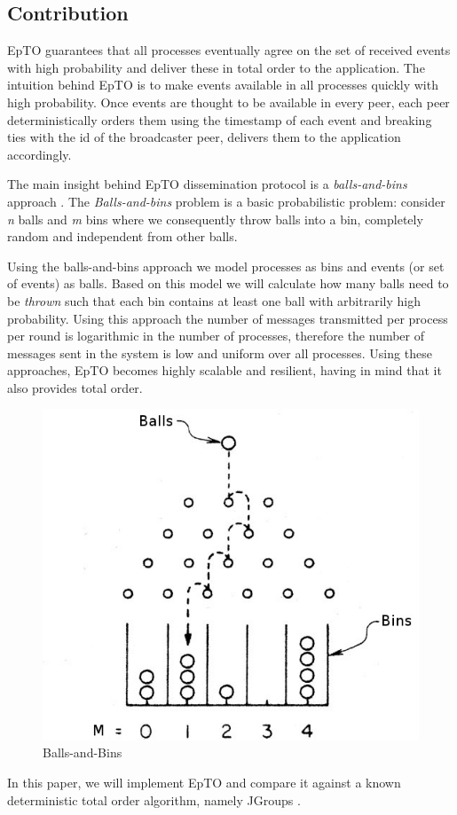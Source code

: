 \documentclass[10pt,conference,a4paper]{IEEEtran}
\begin{document}
\subsection{Contribution}
EpTO \autocite{matos2015epto} guarantees that all processes eventually agree on the set of received events with high probability and deliver these in total order to the application. The intuition behind EpTO is to make events available in all processes quickly with high probability.
Once events are thought to be available in every peer, each peer deterministically orders them using the timestamp of each event and breaking ties with the id of the broadcaster peer, delivers them to the application accordingly.
\par
The main insight behind EpTO dissemination protocol is a \textit{balls-and-bins} approach \autocite{Koldehofe02simplegossiping}. The \textit{Balls-and-bins} problem is a basic probabilistic problem: consider \textit{n} balls and \textit{m} bins where we consequently throw balls into a bin, completely random and independent from other balls.
\par
Using the balls-and-bins approach we model processes as bins and events (or set of events) as balls. Based on this model we will calculate how many balls need to be \textit{thrown} such that each bin contains at least one ball with arbitrarily high probability. Using this approach the number of messages transmitted per process per round is logarithmic in the number of processes, therefore the number of messages sent in the system is low and uniform over all processes. Using these approaches, EpTO becomes highly scalable and resilient, having in mind that it also provides total order.


\begin{figure}
\includegraphics[width=\linewidth]{figures/BnB.jpeg}
\caption{Balls-and-Bins}
\label{fig:balls-and-bins}
\end{figure}
\par
In this paper, we will implement EpTO and compare it against a known deterministic total order algorithm, namely JGroups \autocite{jgroups}.
\end{document}
